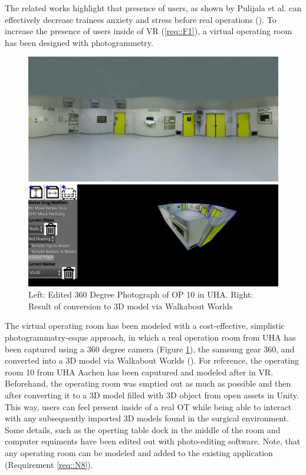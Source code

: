 The related works highlight that presence of users, as shown by Pulijala et al. can effectively decrease trainees anxiety and stress before real operations (\cite{Pulijala.2017}).
To increase the presence of users inside of VR (\ref{req::F1}), a virtual operating room has been designed with photogrammetry.

\begin{figure}[ht]
    \centering
    \begin{minipage}{.5\textwidth}
      \centering
      \includegraphics[width=0.95\linewidth]{images/implementation/operating_room_360.png}
    \end{minipage}%
    \begin{minipage}{.5\textwidth}
      \centering
      \includegraphics[width=0.95\linewidth]{images/implementation/walkabout_worlds.png}
    \end{minipage}
    \caption{\label{fig::360OperatingRoom}Left: Edited 360 Degree Photograph of OP 10 in UHA. Right: Result of conversion to 3D model via Walkabout Worlds}
\end{figure}

The virtual operating room has been modeled with a cost-effective, simplistic photogrammatry-esque approach, in which a real operation room from UHA has been captured using a 360 degree camera (Figure \ref{fig::360OperatingRoom}), the samsung gear 360, and converted into a 3D model via Walkabout Worlds (\cite{WalkaboutWorlds}).
For reference, the operating room 10 from UHA Aachen has been caputured and modeled after in VR.
Beforehand, the operating room was emptied out as much as possible and then after converting it to a 3D model filled with 3D object from open assets in Unity.
This way, users can feel present inside of a real OT while being able to interact with any subsequently imported 3D models found in the surgical environment.
Some details, such as the operting table dock in the middle of the room and computer equiments have been edited out with photo-editing software.
Note, that any operating room can be modeled and added to the existing application (Requirement \ref{req::N8}).


